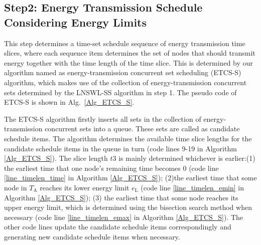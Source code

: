 \documentclass[journal,10pt]{IEEEtran}
\begin{document}
\subsection{Step2: Energy Transmission Schedule Considering Energy Limits}

This step determines a time-set schedule sequence of energy transmission time slices, where each sequence item determines the set of nodes that should transmit energy together with the time length of the time slice. This is determined by our algorithm named as energy-transmission concurrent set scheduling (ETCS-S) algorithm, which makes use of the collection of energy-transmission concurrent sets determined by the LNSWL-SS algorithm in step 1. The pseudo code of ETCS-S is shown in Alg.~\ref{Alg_ETCS_S}.

The ETCS-S algorithm firstly inserts all sets in the collection of energy-transmission concurrent sets into a queue. These sets are called as candidate schedule items. The algorithm determines the available time slice lengths for the candidate schedule items in the queue in turn (code lines 9-19 in Algorithm \ref{Alg_ETCS_S}). The slice length $t3$ is mainly determined whichever is earlier:(1) the earliest time that one node's remaining time becomes 0 (code line \ref{line_timelen_time} in Algorithm \ref{Alg_ETCS_S}); (2)the earliest time that some node in $T_\text{A}$ reaches its lower energy limit $e_\text{L}$ (code line \ref{line_timelen_emin} in Algorithm \ref{Alg_ETCS_S}); (3) the earliest time that some node reaches its upper energy limit, which is determined using the bisection search method when necessary (code line \ref{line_timelen_emax} in Algorithm \ref{Alg_ETCS_S}). The other code lines update the candidate schedule items correspondingly and generating new candidate schedule items when necessary.
\end{document}

